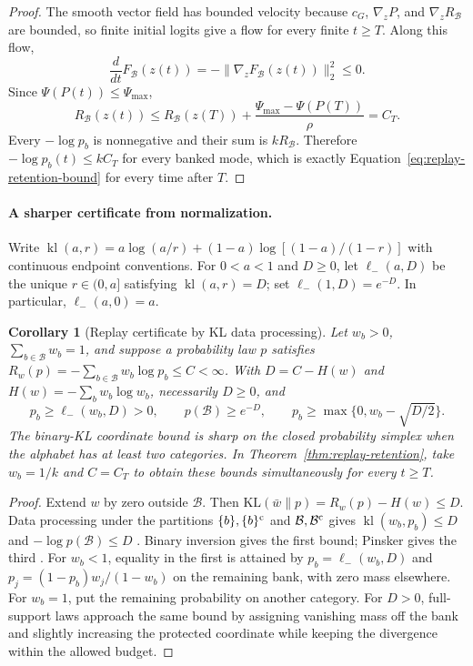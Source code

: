 \documentclass{article}
\newcommand{\enforcehalffinalproseline}{%
  \setlength{\parfillskip}{0pt plus .20\linewidth}}
\newcommand{\1}{\mathbf 1}
\newtheorem{corollary}[lemma]{Corollary}
\theoremstyle{remark}
\theoremstyle{definition}
\theoremstyle{plain}
\begin{document}
\begin{proof}
\enforcehalffinalproseline
The smooth vector field has bounded velocity because $c_G$,
$\nabla_zP$, and $\nabla_zR_{\mathcal B}$ are bounded, so finite initial
logits give a flow for every finite $t\ge T$. Along this flow,
\[
  \frac{d}{dt}F_{\mathcal B}(z(t))
  =-\lVert\nabla_zF_{\mathcal B}(z(t))\rVert_2^2\le0.
\]
Since $\Psi(P(t))\le\Psi_{\max}$,
\[
  R_{\mathcal B}(z(t))
  \le R_{\mathcal B}(z(T))
     +\frac{\Psi_{\max}-\Psi(P(T))}{\rho}
  =C_T.
\]
Every $-\log p_b$ is nonnegative and their sum is
$kR_{\mathcal B}$. Therefore
$-\log p_b(t)\le kC_T$ for every banked mode, which is exactly
Equation~\eqref{eq:replay-retention-bound} for every time after $T$.
\end{proof}

\paragraph{A sharper certificate from normalization.}
Write $\operatorname{kl}(a,r)=a\log(a/r)+(1-a)\log[(1-a)/(1-r)]$
with continuous endpoint conventions. For $0<a<1$ and $D\ge0$, let
$\ell_-(a,D)$ be the unique $r\in(0,a]$ satisfying
$\operatorname{kl}(a,r)=D$; set $\ell_-(1,D)=e^{-D}$.
In particular, $\ell_-(a,0)=a$.

\begin{corollary}[Replay certificate by KL data processing]
\enforcehalffinalproseline
\label{cor:replay-sharp-kl-certificate}
Let $w_b>0$, $\sum_{b\in\mathcal B}w_b=1$, and suppose a probability law
$p$ satisfies $R_w(p)=-\sum_{b\in\mathcal B}w_b\log p_b\le C<\infty$.
With $D=C-H(w)$ and $H(w)=-\sum_bw_b\log w_b$, necessarily $D\ge0$, and
\begin{equation}
 p_b\ge\ell_-(w_b,D)>0,\qquad
 p(\mathcal B)\ge e^{-D},\qquad
 p_b\ge\max\{0,w_b-\sqrt{D/2}\}.
 \label{eq:replay-sharp-kl-certificate}
\end{equation}
The binary-KL coordinate bound is sharp on the closed probability simplex
when the alphabet has at least two categories. In
Theorem~\ref{thm:replay-retention}, take $w_b=1/k$ and $C=C_T$ to obtain
these bounds simultaneously for every $t\ge T$.
\end{corollary}
\begin{proof}
\enforcehalffinalproseline
Extend $w$ by zero outside $\mathcal B$. Then
$\mathrm{KL}(\bar w\|p)=R_w(p)-H(w)\le D$.
Data processing under the partitions $\{b\},\{b\}^{\rm c}$ and
$\mathcal B,\mathcal B^{\rm c}$ gives
$\operatorname{kl}(w_b,p_b)\le D$ and $-\log p(\mathcal B)\le D$
\citep[Theorem~9]{vanerven2014renyi}. Binary inversion gives the first
bound; Pinsker gives the third \citep[Theorem~31]{vanerven2014renyi}.
For $w_b<1$, equality in the first is attained by
$p_b=\ell_-(w_b,D)$ and
$p_j=(1-p_b)w_j/(1-w_b)$ on the remaining bank, with zero mass elsewhere.
For $w_b=1$, put the remaining probability on another category.
For $D>0$, full-support laws approach the same bound by assigning vanishing
mass off the bank and slightly increasing the protected coordinate while
keeping the divergence within the allowed budget.
\end{proof}
\end{document}
